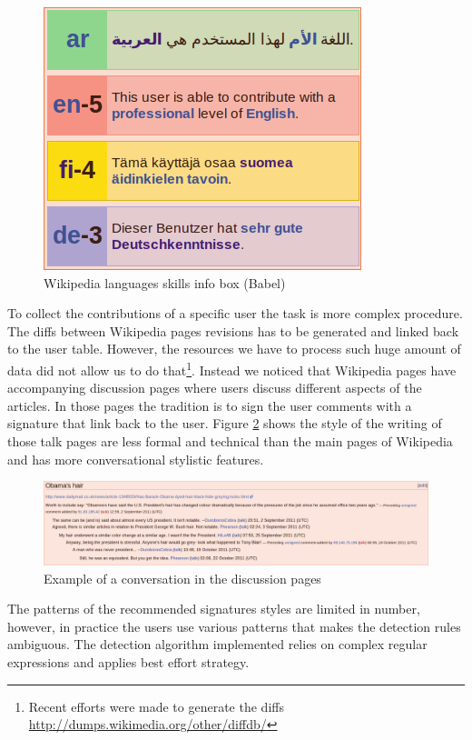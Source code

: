\documentclass[11pt]{article}
\begin{document}
\begin{figure}[htp]
\centering
\includegraphics[scale=0.60]{babel}
\caption{Wikipedia languages skills info box (Babel)}
\label{babel}
\end{figure}

To collect the contributions of a specific user the task is more complex procedure. The diffs between Wikipedia pages revisions has to be generated and linked back to the user table. However, the resources we have to process such huge amount of data did not allow us to do that\footnote{Recent efforts were made to generate the diffs \url{http://dumps.wikimedia.org/other/diffdb/}}. Instead we noticed that Wikipedia pages have accompanying discussion pages where users discuss different aspects of the articles. In those pages the tradition is to sign the user comments with a signature that link back to the user. Figure \ref{obama} shows the style of the writing of those talk pages are less formal and technical than the main pages of Wikipedia and has more conversational stylistic features.

\begin{figure}[Htp]
\centering
\includegraphics[scale=0.285]{obama.png}
\caption{Example of a conversation in the discussion pages}
\label{obama}
\end{figure}

The patterns of the recommended signatures styles are limited in number, however, in practice the users use various patterns that makes the detection rules ambiguous. The detection algorithm implemented relies on complex regular expressions and applies best effort strategy.
\end{document}
